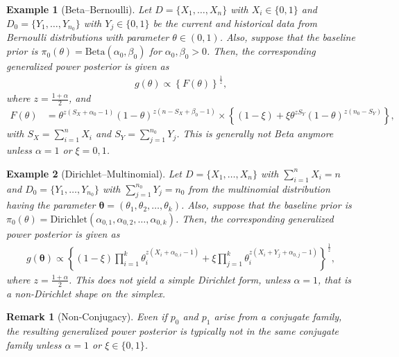 \documentclass[12pt]{article}
\newtheorem{remark}{Remark}
\newtheorem{example}{Example}
\begin{document}
\begin{example}[Beta–Bernoulli]
    Let $D = \{X_1,\dots,X_n\}$ with $X_i \in \{0, 1\}$ and $D_0 = \{Y_1,\dots,Y_{n_0}\}$ with $Y_j \in \{0, 1\}$ be the current and historical data from Bernoulli distributions with parameter $\theta \in (0, 1)$.
    Also, suppose that the baseline prior is $\pi_0(\theta) = \mathrm{Beta}(\alpha_0, \beta_0)$ for $\alpha_0, \beta_0 > 0$.
    Then, the corresponding generalized power posterior is given as
    \begin{align*}
        g(\theta) \propto \left\{F(\theta)\right\}^{\frac{1}{z}},
    \end{align*}
    where $z = \frac{1 + \alpha}{2}$, and
    \begin{align*}
        F(\theta) &= \theta^{z(S_X + \alpha_0 - 1)}(1 - \theta)^{z(n - S_X + \beta_0 - 1)} \times \left\{(1 - \xi) + \xi \theta^{z S_Y}(1 - \theta)^{z(n_0 - S_Y)}\right\},
    \end{align*}
    with $S_X = \sum^n_{i=1}X_i$ and $S_Y = \sum^{n_0}_{j=1}Y_j$.
    This is generally not Beta anymore unless $\alpha = 1$ or $\xi=0,1$.
\end{example}



\begin{example}[Dirichlet–Multinomial]
    Let $D = \{X_1,\dots,X_n\}$ with $\sum^n_{i=1 }X_i = n$ and $D_0 = \{Y_1,\dots,Y_{n_0}\}$ with $\sum^{n_0}_{j=1}Y_j = n_0$ from the multinomial distribution having the parameter $\bm{\theta} = (\theta_1,\theta_2,\dots,\theta_k)$.
    Also, suppose that the baseline prior is $\pi_0(\theta) = \mathrm{Dirichlet}(\alpha_{0,1},\alpha_{0,2},\dots,\alpha_{0,k})$.
    Then, the corresponding generalized power posterior is given as
    \begin{align*}
        g(\bm{\theta}) \propto \left\{(1 - \xi)\prod^k_{i=1}\theta_i^{z(X_i + \alpha_{0,i} - 1)} + \xi \prod^k_{j=1}\theta_i^{z(X_i + Y_j + \alpha_{0,j} - 1)} \right\}^{\frac{1}{z}},
    \end{align*}
    where $z = \frac{1 + \alpha}{2}$.
    This does not yield a simple Dirichlet form, unless $\alpha = 1$, that is a non-Dirichlet shape on the simplex.
\end{example}

\begin{remark}[Non-Conjugacy]
    Even if $p_0$ and $p_1$ arise from a conjugate family, the resulting generalized power posterior is typically not in the same conjugate family unless $\alpha = 1$ or $\xi \in \{0, 1\}$.
\end{remark}
\end{document}

